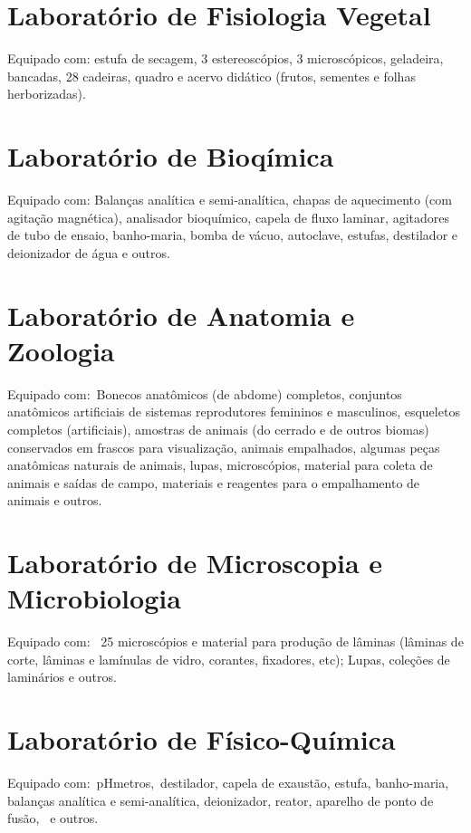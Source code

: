 \documentclass[11pt,fleqn]{book} %
\begin{document}
\section{Laboratório de Fisiologia Vegetal}

Equipado com: estufa de secagem, 3 estereoscópios, 3 microscópicos, geladeira, bancadas, 28 cadeiras, quadro e acervo didático (frutos, sementes e folhas herborizadas). 

\section{Laboratório de Bioqímica}

Equipado com: Balanças analítica e semi-analítica, chapas de aquecimento (com agitação magnética), analisador bioquímico, capela de fluxo laminar, agitadores de tubo de ensaio, banho-maria, bomba de vácuo, autoclave, estufas, destilador e deionizador de água e outros.

\section{Laboratório de Anatomia e Zoologia}

Equipado com: Bonecos anatômicos (de abdome) completos, conjuntos anatômicos artificiais de sistemas reprodutores femininos e masculinos, esqueletos completos (artificiais), amostras de animais (do cerrado e de outros biomas) conservados em frascos para visualização, animais empalhados, algumas peças anatômicas naturais de animais, lupas, microscópios, material para coleta de animais e saídas de campo, materiais e reagentes para o empalhamento de animais e outros.

\section{Laboratório de Microscopia e Microbiologia}

Equipado com:  25 microscópios e material para produção de lâminas (lâminas de corte, lâminas e lamínulas de vidro, corantes, fixadores, etc); Lupas, coleções de laminários e outros.

\section{Laboratório de Físico-Química}

Equipado com: pHmetros, destilador, capela de exaustão, estufa, banho-maria, balanças analítica e semi-analítica, deionizador, reator, aparelho de ponto de fusão,  e outros.
\end{document}
